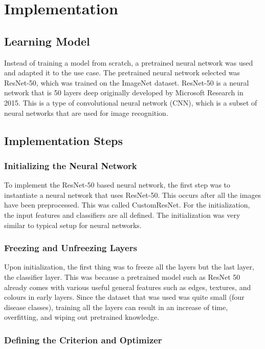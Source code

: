 \documentclass[11pt]{article}
\begin{document}
\section{Implementation}

\subsection{Learning Model}
Instead of training a model from scratch, a pretrained neural network was used and adapted it to the use case. The pretrained neural network selected was ResNet-50, which was trained on the ImageNet dataset. ResNet-50 is a neural network that is 50 layers deep originally developed by Microsoft Research in 2015. This is a type of convolutional neural network (CNN), which is a subset of neural networks that are used for image recognition.

\subsection{Implementation Steps}

\subsubsection{Initializing the Neural Network}
To implement the ResNet-50 based neural network, the first step was to instantiate a neural network that uses ResNet-50. This occurs after all the images have been preprocessed. This was called CustomResNet. For the initialization, the input features and classifiers are all defined. The initialization was very similar to typical setup for neural networks.

\subsubsection{Freezing and Unfreezing Layers}

Upon initialization, the first thing was to freeze all the layers but the last layer, the classifier layer. This was because a pretrained model such as ResNet 50 already comes with various useful general features such as edges, textures, and colours in early layers. Since the dataset that was used was quite small (four disease classes), training all the layers can result in an increase of time, overfitting, and wiping out pretrained knowledge.

\subsubsection{Defining the Criterion and Optimizer}
\end{document}
